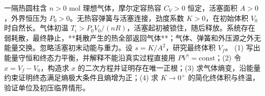 一隔热圆柱含 \(n>0\) mol 理想气体，摩尔定容热容 \(C_V>0\) 恒定，活塞面积 \(A>0\)，外界恒压为 \(P_0>0\)。无热容弹簧与活塞连接，劲度系数 \(K>0\)，在初始体积 \(V_0\) 时自然长。气体初温 \(T_i>P_0V_0/(nR)\)，活塞起初被锁住，随后释放。系统存在弱耗散，最终静止，**耗散产生的热全部返回气体**；气体、弹簧和外压源之外无能量交换。忽略活塞初末动能与重力。设 \(s=K/A^2\)，研究最终体积 \(V_f\)。
(1) 写出能量守恒和终态力平衡，并解释不能沿真实过程直接用 \(PV^\gamma=\mathrm{const}\)；(2) 令 \(x=V_f-V_0\)，构造求 \(x\) 的二次方程并证明存在唯一正根；(3) 求气体熵变，沿能量约束证明终态满足熵极大条件且熵增为正；(4) 求 \(K\to0^+\) 的简化终体积与终温，验证单位及初压临界情形。
